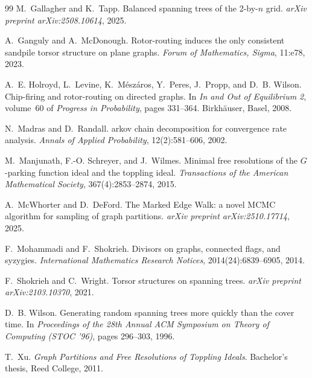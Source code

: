 \documentclass[11pt]{article}
\begin{document}
\begin{thebibliography}{99}
M.~Gallagher and K.~Tapp.
\newblock Balanced spanning trees of the 2-by-$n$ grid.
\newblock \emph{arXiv preprint arXiv:2508.10614}, 2025.

A.~Ganguly and A.~McDonough.
\newblock Rotor-routing induces the only consistent sandpile torsor structure
  on plane graphs.
\newblock \emph{Forum of Mathematics, Sigma}, 11:e78, 2023.

A.~E. Holroyd, L.~Levine, K.~M\'esz\'aros, Y.~Peres, J.~Propp, and D.~B.
  Wilson.
\newblock Chip-firing and rotor-routing on directed graphs.
\newblock In \emph{In and Out of Equilibrium 2}, volume~60 of \emph{Progress
  in Probability}, pages 331--364. Birkh\"auser, Basel, 2008.

N.~Madras and D.~Randall.
arkov chain decomposition for convergence rate analysis.
\newblock \emph{Annals of Applied Probability}, 12(2):581--606, 2002.

M.~Manjunath, F.-O. Schreyer, and J.~Wilmes.
\newblock Minimal free resolutions of the {$G$}-parking function ideal and
  the toppling ideal.
\newblock \emph{Transactions of the American Mathematical Society},
  367(4):2853--2874, 2015.

A.~McWhorter and D.~DeFord.
\newblock The {M}arked {E}dge {W}alk: a novel {MCMC} algorithm for sampling
  of graph partitions.
\newblock \emph{arXiv preprint arXiv:2510.17714}, 2025.

F.~Mohammadi and F.~Shokrieh.
\newblock Divisors on graphs, connected flags, and syzygies.
\newblock \emph{International Mathematics Research Notices},
  2014(24):6839--6905, 2014.

F.~Shokrieh and C.~Wright.
\newblock Torsor structures on spanning trees.
\newblock \emph{arXiv preprint arXiv:2103.10370}, 2021.

D.~B. Wilson.
\newblock Generating random spanning trees more quickly than the cover time.
\newblock In \emph{Proceedings of the 28th Annual ACM Symposium on Theory of
  Computing (STOC '96)}, pages 296--303, 1996.

T.~Xu.
\newblock \emph{Graph Partitions and Free Resolutions of Toppling Ideals}.
\newblock Bachelor's thesis, Reed College, 2011.

\end{thebibliography}
\end{document}
